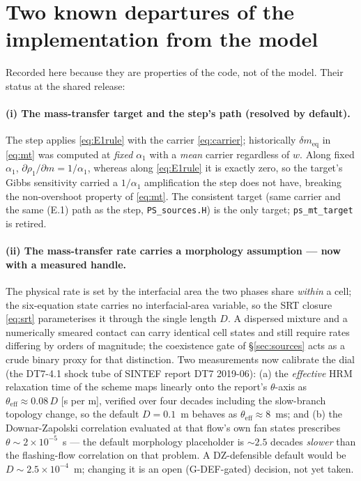 \documentclass[11pt,a4paper]{article}
\newcommand{\code}[1]{\texttt{\small #1}}
\newcommand{\src}[1]{{\color{gray}\code{#1}}}
\begin{document}
\section{Two known departures of the implementation from the model}
\label{sec:caveats}

Recorded here because they are properties of the code, not of the model.
Their status at the shared release:

\paragraph{(i) The mass-transfer target and the step's path (resolved by
default).}
The step applies \eqref{eq:E1rule} with the carrier \eqref{eq:carrier};
historically $\delta m_{\mathrm{eq}}$ in \eqref{eq:mt} was computed at
\emph{fixed} $\alpha_1$ with a \emph{mean} carrier regardless of $w$.
Along fixed $\alpha_1$, $\partial\rho_1/\partial m = 1/\alpha_1$, whereas
along \eqref{eq:E1rule} it is exactly zero, so the target's Gibbs
sensitivity carried a $1/\alpha_1$ amplification the step does not have,
breaking the non-overshoot property of \eqref{eq:mt}.
The consistent target (same carrier and the same (E.1) path as the step,
\src{PS\_sources.H}) is the only target; \code{ps\_mt\_target} is retired.

\paragraph{(ii) The mass-transfer rate carries a morphology assumption ---
now with a measured handle.}
The physical rate is set by the interfacial area the two phases share
\emph{within} a cell; the six-equation state carries no interfacial-area
variable, so the SRT closure \eqref{eq:srt} parameterises it through the
single length $D$.  A dispersed mixture and a numerically smeared contact
can carry identical cell states and still require rates differing by
orders of magnitude; the coexistence gate of \S\ref{sec:sources} acts as a
crude binary proxy for that distinction.  Two measurements now calibrate
the dial (the DT7-4.1 shock tube of SINTEF report
DT7 2019-06): (a) the \emph{effective} HRM relaxation time of the scheme
maps linearly onto the report's $\theta$-axis as
$\theta_{\mathrm{eff}} \approx 0.08\,D$ [s per m], verified over four
decades including the slow-branch topology change, so the default
$D=0.1$~m behaves as $\theta_{\mathrm{eff}}\approx8$~ms; and (b) the
Downar-Zapolski correlation evaluated at that flow's own fan states
prescribes $\theta\sim2\times10^{-5}$~s --- the default morphology
placeholder is $\sim\!2.5$ decades \emph{slower} than the flashing-flow
correlation on that problem.  A DZ-defensible default would be
$D\sim2.5\times10^{-4}$~m; changing it is an open (G-DEF-gated) decision,
not yet taken.
\end{document}
